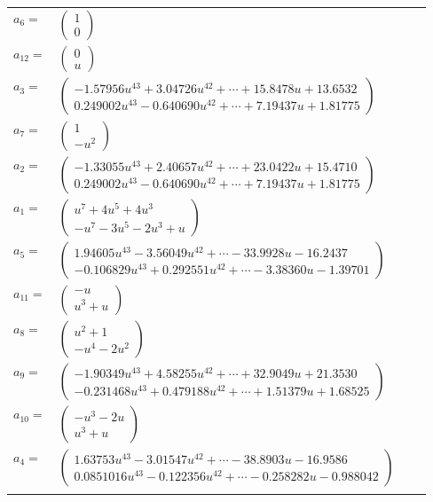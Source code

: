 \documentclass[1p]{elsarticle_modified}
\theoremstyle{definition}
\begin{document}
\begin{tabular}{m{7pt} m{180pt} m{7pt} m{180pt} }
\flushright $a_{6}=$&$\begin{pmatrix}1\\0\end{pmatrix}$ \\
\flushright $a_{12}=$&$\begin{pmatrix}0\\u\end{pmatrix}$ \\
\flushright $a_{3}=$&$\begin{pmatrix}-1.57956 u^{43}+3.04726 u^{42}+\cdots+15.8478 u+13.6532\\0.249002 u^{43}-0.640690 u^{42}+\cdots+7.19437 u+1.81775\end{pmatrix}$ \\
\flushright $a_{7}=$&$\begin{pmatrix}1\\- u^2\end{pmatrix}$ \\
\flushright $a_{2}=$&$\begin{pmatrix}-1.33055 u^{43}+2.40657 u^{42}+\cdots+23.0422 u+15.4710\\0.249002 u^{43}-0.640690 u^{42}+\cdots+7.19437 u+1.81775\end{pmatrix}$ \\
\flushright $a_{1}=$&$\begin{pmatrix}u^7+4 u^5+4 u^3\\- u^7-3 u^5-2 u^3+u\end{pmatrix}$ \\
\flushright $a_{5}=$&$\begin{pmatrix}1.94605 u^{43}-3.56049 u^{42}+\cdots-33.9928 u-16.2437\\-0.106829 u^{43}+0.292551 u^{42}+\cdots-3.38360 u-1.39701\end{pmatrix}$ \\
\flushright $a_{11}=$&$\begin{pmatrix}- u\\u^3+u\end{pmatrix}$ \\
\flushright $a_{8}=$&$\begin{pmatrix}u^2+1\\- u^4-2 u^2\end{pmatrix}$ \\
\flushright $a_{9}=$&$\begin{pmatrix}-1.90349 u^{43}+4.58255 u^{42}+\cdots+32.9049 u+21.3530\\-0.231468 u^{43}+0.479188 u^{42}+\cdots+1.51379 u+1.68525\end{pmatrix}$ \\
\flushright $a_{10}=$&$\begin{pmatrix}- u^3-2 u\\u^3+u\end{pmatrix}$ \\
\flushright $a_{4}=$&$\begin{pmatrix}1.63753 u^{43}-3.01547 u^{42}+\cdots-38.8903 u-16.9586\\0.0851016 u^{43}-0.122356 u^{42}+\cdots-0.258282 u-0.988042\end{pmatrix}$\\&\end{tabular}
\end{document}
